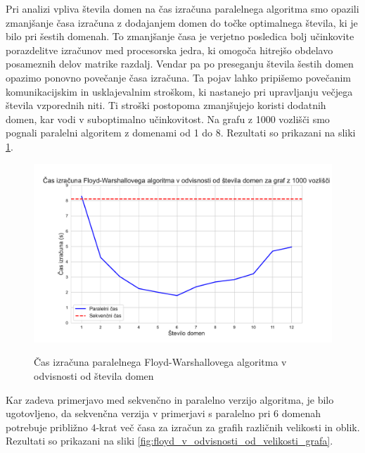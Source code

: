 \documentclass[mat1, tisk]{fmfdelo}
\begin{document}
Pri analizi vpliva števila domen na čas izračuna paralelnega algoritma smo opazili zmanjšanje časa izračuna z dodajanjem domen do točke
optimalnega števila, ki je bilo pri šestih domenah. To zmanjšanje časa je verjetno posledica bolj učinkovite porazdelitve izračunov med procesorska jedra,
ki omogoča hitrejšo obdelavo posameznih delov matrike razdalj. Vendar pa po preseganju števila šestih domen opazimo ponovno povečanje časa izračuna.
Ta pojav lahko pripišemo povečanim komunikacijskim in usklajevalnim stroškom, ki nastanejo pri upravljanju večjega števila vzporednih niti.
Ti stroški postopoma zmanjšujejo koristi dodatnih domen, kar vodi v suboptimalno učinkovitost.
Na grafu z 1000 vozlišči smo pognali paralelni algoritem z domenami od 1 do 8. Rezultati so prikazani na sliki \ref{fig:floyd_v_odvisnosti_od_stevila_domen}.


\begin{figure}[h!]
  \centering
  \caption{Čas izračuna paralelnega Floyd-Warshallovega algoritma v odvisnosti od števila domen}
  \includegraphics[width=15cm]{slike/floyd_v_odvisnosti_od_stevila_domen.pdf}
  \label{fig:floyd_v_odvisnosti_od_stevila_domen}
\end{figure}

Kar zadeva primerjavo med sekvenčno in paralelno verzijo algoritma, je bilo ugotovljeno, da sekvenčna verzija v primerjavi s paralelno pri 6 domenah
potrebuje približno 4-krat več časa za izračun za grafih različnih velikosti in oblik. Rezultati so prikazani na sliki \ref{fig:floyd_v_odvisnosti_od_velikosti_grafa}.
\end{document}
